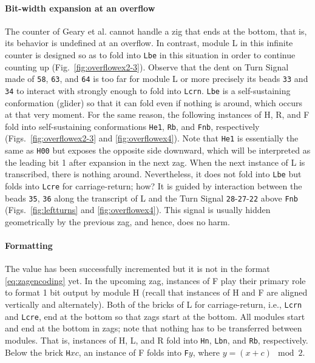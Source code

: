 \documentclass[twocolumn]{svjour3}
\begin{document}
\paragraph{Bit-width expansion at an overflow}
The counter of Geary et al. cannot handle a zig that ends at the bottom, that is, its behavior is undefined at an overflow.
In contrast, module L in this infinite counter is designed so as to fold into \texttt{Lbe} in this situation in order to continue counting up (Fig.~\ref{fig:overflowex2-3}).
Observe that the dent on Turn Signal made of \texttt{58}, \texttt{63}, and \texttt{64} is too far for module L or more precisely its beads \texttt{33} and \texttt{34} to interact with strongly enough to fold into \texttt{Lcrn}.
\texttt{Lbe} is a self-sustaining conformation (glider) so that it can fold even if nothing is around, which occurs at that very moment.
For the same reason, the following instances of H, R, and F fold into self-sustaining conformations \texttt{He1}, \texttt{Rb}, and \texttt{Fnb}, respectively (Figs.~\ref{fig:overflowex2-3} and \ref{fig:overflowex4}).
Note that \texttt{He1} is essentially the same as \texttt{H00} but exposes the opposite side downward, which will be interpreted as the leading bit 1 after expansion in the next zag.
When the next instance of L is transcribed, there is nothing around.
Nevertheless, it does not fold into \texttt{Lbe} but folds into \texttt{Lcre} for carriage-return; how?
It is guided by interaction between the beads \texttt{35}, \texttt{36} along the transcript of L and the Turn Signal \texttt{28}{-}\texttt{27}{-}\texttt{22} above \texttt{Fnb} (Figs.~\ref{fig:leftturns} and \ref{fig:overflowex4}).
This signal is usually hidden geometrically by the previous zag, and hence, does no harm.


\paragraph{Formatting}
The value has been successfully incremented but it is not in the format \eqref{eq:zagencoding} yet.
In the upcoming zag, instances of F play their primary role to format 1 bit output by module H (recall that instances of H and F are aligned vertically and alternately).
Both of the bricks of L for carriage-return, i.e., \texttt{Lcrn} and \texttt{Lcre}, end at the bottom so that zags start at the bottom.
All modules start and end at the bottom in zags; note that nothing has to be transferred between modules.
That is, instances of H, L, and R fold into \texttt{Hn}, \texttt{Lbn}, and \texttt{Rb}, respectively.
Below the brick \texttt{H}$xc$, an instance of F folds into \texttt{F}$y$, where $y = (x+c) \mod 2$.
\end{document}
